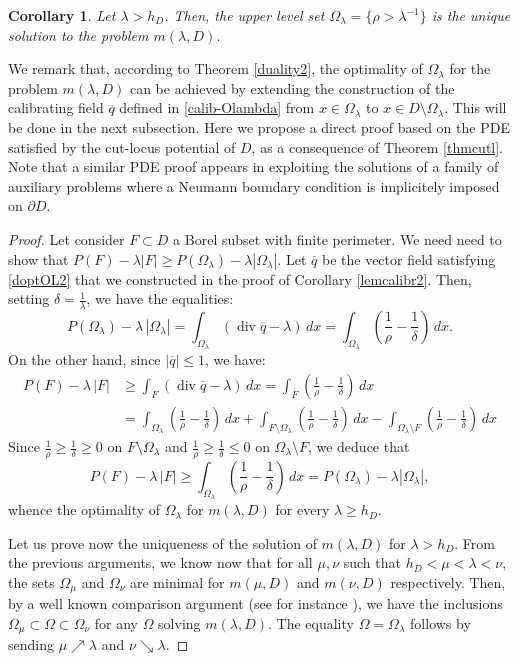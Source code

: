 \documentclass[reqno,11pt]{amsart}
\newtheorem{corollary}[theorem]{Corollary}
\theoremstyle{definition}
\numberwithin{equation}{section}
\def\ov{\overline}
\DeclareMathOperator{\Div}{div}
\newcommand{\1}{{{\bf 1}\kern-0,28em\rm l}}
\def\O{\Omega}
\def\l{\lambda}
\begin{document}
 \begin{corollary}\label{opti-mlD}
Let $ \lambda > h_D$. Then,  the upper level set 
$\O_\l=  \{ \rho > \lambda^{-1}\} $
is the unique solution to the problem $m(\lambda,D)$.
\end{corollary}

We remark that, according to Theorem \ref{duality2}, the optimality of $\Omega_\l$ for the problem $m(\l,D)$ can be achieved by extending the construction
 of the  calibrating field $\ov q$ defined in  \eqref{calib-Olambda} from  $x\in \Omega_\l$ to $x\in D\setminus \O_\l$. This will be done in the next subsection.  
Here we propose a  direct  proof based on the PDE satisfied by the cut-locus potential of $D$, as a consequence of Theorem \ref{thmcutl}. 
Note that a similar PDE proof appears in  \cite[Proposition 4]{alter2005characterization}  exploiting the solutions of a family of auxiliary problems where a Neumann boundary condition is implicitely imposed on $\partial D$. 


\begin{proof}
Let  consider  $F \subset D$ a Borel subset with finite perimeter.  We need need to show that $P(F) -\l |F| \ge P(\O_\l)- \l |\O_\l|$.
Let $\ov q$ be the vector field satisfying \eqref{doptOL2} that we constructed in the proof of Corollary \ref{lemcalibr2}. 
Then, setting $\delta= \frac{1}{\l}$, we have the equalities:
$$P(\O_\l)- \l\, |\O_\l|= \int_{\O_\l} (\Div \ov q -\l)\, dx = \int_{\O_\l} \left( \frac1{\rho} - \frac1{\delta}\right)\, dx.$$
 On the other hand, since $|\ov q|\le 1$, we have:
\begin{align*}  P(F)- \l\, |F| &\ge  \int_F (\Div \ov q -\l)\, dx = \int_F \left( \frac1{\rho} - \frac1{\delta}\right)\, dx \\
& =  \int_{\O_\l} \left( \frac1{\rho} - \frac1{\delta}\right)\, dx +  \int_{F\setminus \O_\l} \left( \frac1{\rho} - \frac1{\delta}\right)\, dx -  \int_{\O_\l\setminus F} \left( \frac1{\rho} - \frac1{\delta}\right)\, dx
\end{align*} 
Since $\frac1{\rho} \ge \frac1{\delta} \ge 0$ on $F\setminus \O_\l$ and $\frac1{\rho} \ge \frac1{\delta} \le 0$ on $\O_\l\setminus F$, we deduce that
$$P(F)- \l\, |F| \ge \int_{\O_\l} \left( \frac1{\rho} - \frac1{\delta}\right)\, dx = P(\O_\l) - \l |\O_\l| ,$$
whence the optimality of $\O_\l$ for $m(\l,D)$ for every $\l\ge h_D$.

Let us prove now the uniqueness of the solution of $m(\l,D)$ for  $\l>h_D$. From the previous arguments, we know now that for all $\mu,\nu$ such that $h_D<\mu<\l<\nu$, the sets $\O_\mu$ and $\O_\nu$ are minimal for $m(\mu,D)$ and $m(\nu,D)$ respectively. Then, by a well known comparison argument (see for instance \cite[Lemma 4 (i)]{alter2005characterization}), we have the inclusions $\O_\mu \subset \O \subset \O_\nu$  for any $\O$ solving $m(\l,D)$.  
The equality $\O=\O_\l$ follows by sending $\mu \nearrow \l$ and $\nu \searrow \l$.


\end{proof}
\end{document}
